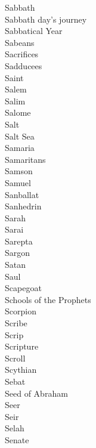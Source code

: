 Sabbath  \\
Sabbath day’s journey  \\
Sabbatical Year  \\
Sabeans  \\
Sacrifices  \\
Sadducees  \\
Saint  \\
Salem  \\
Salim  \\
Salome  \\
Salt  \\
Salt Sea  \\
Samaria  \\
Samaritans  \\
Samson  \\
Samuel  \\
Sanballat  \\
Sanhedrin  \\
Sarah  \\
Sarai  \\
Sarepta  \\
Sargon  \\
Satan  \\
Saul  \\
Scapegoat  \\
Schools of the Prophets  \\
Scorpion  \\
Scribe  \\
Scrip  \\
Scripture  \\
Scroll  \\
Scythian  \\
Sebat  \\
Seed of Abraham  \\
Seer  \\
Seir  \\
Selah  \\
Senate  \\
